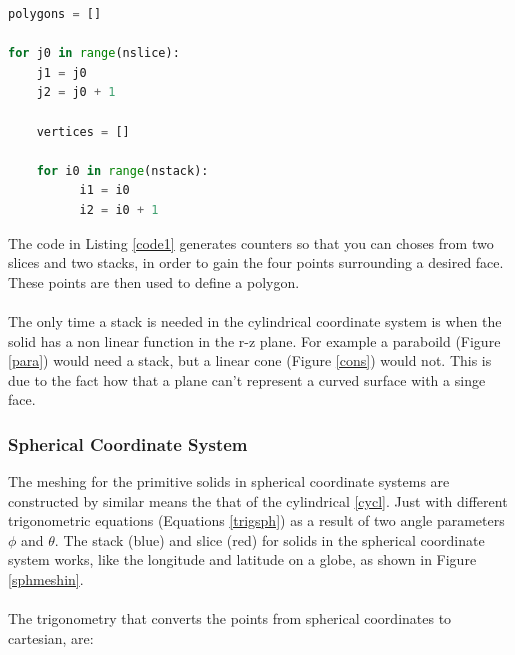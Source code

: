 \documentclass[12pt,a4paper]{article}
\begin{document}
\newpage
\begin{lstlisting}[language=Python, label=code1, caption=Basic method structure for pyg4ometry primitive meshing of solids]
polygons = []

for j0 in range(nslice):
    j1 = j0
    j2 = j0 + 1
    
    vertices = []

    for i0 in range(nstack):
          i1 = i0
          i2 = i0 + 1     

\end{lstlisting}
The code in Listing \ref{code1} generates counters so that you can choses from two slices and two stacks, in order to gain the four points surrounding a desired face. These points are then used to define a polygon. 
\\\\
The only time a stack is needed in the cylindrical coordinate system is when the solid has a non linear function in the r-z plane. For example a paraboild (Figure \ref{para}) would need a stack, but a linear cone (Figure \ref{cons}) would not. This is due to the fact how that a plane can't represent a curved surface with a singe face. 

\newpage
\subsubsection{Spherical Coordinate System}

The meshing for the primitive solids in spherical coordinate systems are constructed by similar means the that of the cylindrical \ref{cycl}. Just with different trigonometric equations (Equations \ref{trigsph}) as a result of two angle parameters $\phi$ and $\theta$. The stack (blue) and slice (red) for solids in the spherical coordinate system works, like the longitude and latitude on a globe, as shown in Figure \ref{sphmeshin}. 
\\\\
The trigonometry that converts the points from spherical coordinates to cartesian, are:
\end{document}
